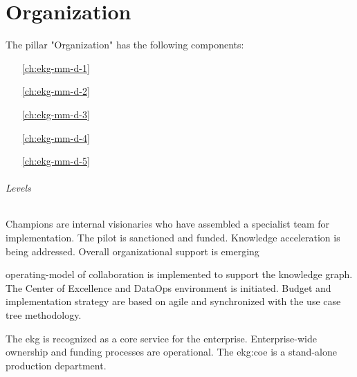 \part{Organization}\label{pt:ekgmm-d} %

The pillar "Organization" has the following components:

\begin{itemize}[leftmargin=.5in]
    \item [\ref{ch:ekg-mm-d-1}] 
    \item [\ref{ch:ekg-mm-d-2}] 
    \item [\ref{ch:ekg-mm-d-3}] 
    \item [\ref{ch:ekg-mm-d-4}] 
    \item [\ref{ch:ekg-mm-d-5}] 
\end{itemize}

\paragraph{Levels}

\begin{description}[nosep,font=\bfseries]

    \item [1. \glsfmtshort{ekg} Initiation, \glsfmtshort{mvp}]
    Champions are internal visionaries who have assembled a specialist team for implementation.
    The pilot is sanctioned and funded.
    Knowledge acceleration is being addressed.
    Overall organizational support is emerging

    \item [2. Extensible Platform (reusable components)]
    \Gls{operating-model} of collaboration is implemented to support the knowledge graph.
    The Center of Excellence and DataOps environment is initiated.
    Budget and implementation strategy are based on agile and synchronized with the
    use case tree methodology.

    \item [3. Enterprise Ready]
    The \gls{ekg} is recognized as a core service for the enterprise.
    Enterprise-wide ownership and funding processes are operational.
    The \gls{ekg:coe} is a stand-alone production department.

\end{description}





